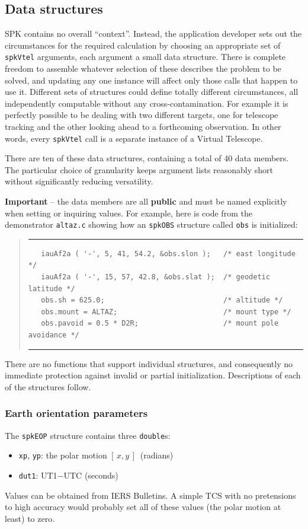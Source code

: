 \documentclass[11pt,fleqn,twoside,\paper]{article}
\renewcommand{\_}{{\tt\char'137}}     %
\newcommand{\xy}        {$[\,x,y\,]$}
\newcommand{\scode}     {\goodbreak
                         \begin{quote}
                         \vspace{-6ex}
                         \rule[-2ex]{36em}{0.03ex}}
\newcommand{\ecode}     {\rule[2ex]{36em}{0.03ex}
                         \end{quote}
                         \vspace{-4ex}
                         \goodbreak}
\begin{document}
\subsection{Data structures}
\label{structs}

SPK contains no overall ``context''.  Instead, the application
developer sets out the circumstances for the required calculation
by choosing an appropriate set of {\tt spkVtel} arguments,
each argument a small data structure.  There is complete
freedom to assemble whatever selection of these describes the
problem to be solved, and updating any one
instance will affect only
those calls that happen to use it.  Different sets of structures
could define totally different circumstances, all independently
computable without any cross-contamination.  For example it is
perfectly possible to be dealing with two different targets, one for
telescope tracking and the other looking ahead to a forthcoming
observation.  In other words, every {\tt spkVtel} call is a
separate instance of a Virtual Telescope.

There are ten of these data structures, containing a total of
40 data members.  The particular choice of granularity keeps
argument lists reasonably short
without significantly reducing versatility.

{\bf Important} -- the data members are all {\bf public} and must be
named explicitly when setting or inquiring values.  For example,
here is code from the demonstrator {\tt altaz.c} showing how an
{\tt spkOBS} structure called {\tt obs} is initialized:
\scode\begin{verbatim}
   iauAf2a ( '-', 5, 41, 54.2, &obs.slon );   /* east longitude */
   iauAf2a ( '-', 15, 57, 42.8, &obs.slat );  /* geodetic latitude */
   obs.sh = 625.0;                            /* altitude */
   obs.mount = ALTAZ;                         /* mount type */
   obs.pavoid = 0.5 * D2R;                    /* mount pole avoidance */
\end{verbatim}\ecode
There are no functions that support individual structures, and
consequently no immediate protection against invalid or partial
initialization.
Descriptions of each of the structures follow.

\subsubsection{Earth orientation parameters}
\label{eop}

The {\tt spkEOP} structure contains three {\tt double}s:
\begin{itemize}
\item {\tt xp}, {\tt yp}: the polar motion \xy\ (radians)
\item {\tt dut1}: UT1$-$UTC (seconds)
\end{itemize}
Values can be obtained from IERS Bulletins.
A simple TCS with no pretensions to high accuracy would probably
set all of these values (the polar motion at least) to zero.
\end{document}
